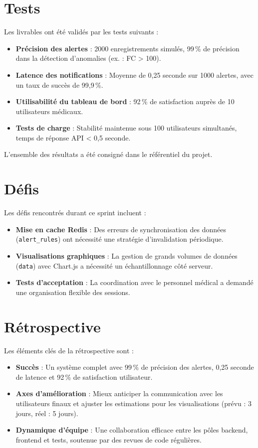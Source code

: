\section{Tests}
Les livrables ont été validés par les tests suivants :
\begin{itemize}
    \item \textbf{Précision des alertes} : 2000 enregistrements simulés, 99\,\% de précision dans la détection d’anomalies (ex. : FC > 100).
    \item \textbf{Latence des notifications} : Moyenne de 0,25 seconde sur 1000 alertes, avec un taux de succès de 99,9\,\%.
    \item \textbf{Utilisabilité du tableau de bord} : 92\,\% de satisfaction auprès de 10 utilisateurs médicaux.
    \item \textbf{Tests de charge} : Stabilité maintenue sous 100 utilisateurs simultanés, temps de réponse API < 0,5 seconde.
\end{itemize}
L’ensemble des résultats a été consigné dans le référentiel du projet.

\section{Défis}
Les défis rencontrés durant ce sprint incluent :
\begin{itemize}
    \item \textbf{Mise en cache Redis} : Des erreurs de synchronisation des données (\texttt{\string alert\_rules}) ont nécessité une stratégie d’invalidation périodique.
    \item \textbf{Visualisations graphiques} : La gestion de grands volumes de données (\texttt{\string data}) avec Chart.js a nécessité un échantillonnage côté serveur.
    \item \textbf{Tests d’acceptation} : La coordination avec le personnel médical a demandé une organisation flexible des sessions.
\end{itemize}

\section{Rétrospective}
Les éléments clés de la rétrospective sont :
\begin{itemize}
    \item \textbf{Succès} : Un système complet avec 99\,\% de précision des alertes, 0,25 seconde de latence et 92\,\% de satisfaction utilisateur.
    \item \textbf{Axes d’amélioration} : Mieux anticiper la communication avec les utilisateurs finaux et ajuster les estimations pour les visualisations (prévu : 3 jours, réel : 5 jours).
    \item \textbf{Dynamique d’équipe} : Une collaboration efficace entre les pôles backend, frontend et tests, soutenue par des revues de code régulières.
\end{itemize}

